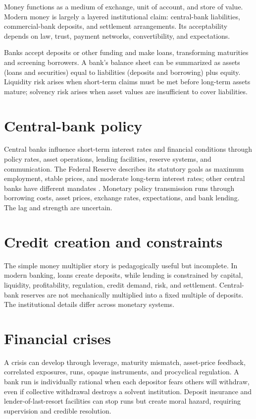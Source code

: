 \documentclass[11pt,oneside,openany]{book}
\begin{document}
Money functions as a medium of exchange, unit of account, and store of value. Modern money is largely a layered institutional claim: central-bank liabilities, commercial-bank deposits, and settlement arrangements. Its acceptability depends on law, trust, payment networks, convertibility, and expectations.

Banks accept deposits or other funding and make loans, transforming maturities and screening borrowers. A bank's balance sheet can be summarized as assets (loans and securities) equal to liabilities (deposits and borrowing) plus equity. Liquidity risk arises when short-term claims must be met before long-term assets mature; solvency risk arises when asset values are insufficient to cover liabilities.

\section{Central-bank policy}

Central banks influence short-term interest rates and financial conditions through policy rates, asset operations, lending facilities, reserve systems, and communication. The Federal Reserve describes its statutory goals as maximum employment, stable prices, and moderate long-term interest rates; other central banks have different mandates \cite{federalreserve}. Monetary policy transmission runs through borrowing costs, asset prices, exchange rates, expectations, and bank lending. The lag and strength are uncertain.

\section{Credit creation and constraints}

The simple money multiplier story is pedagogically useful but incomplete. In modern banking, loans create deposits, while lending is constrained by capital, liquidity, profitability, regulation, credit demand, risk, and settlement. Central-bank reserves are not mechanically multiplied into a fixed multiple of deposits. The institutional details differ across monetary systems.

\section{Financial crises}

A crisis can develop through leverage, maturity mismatch, asset-price feedback, correlated exposures, runs, opaque instruments, and procyclical regulation. A bank run is individually rational when each depositor fears others will withdraw, even if collective withdrawal destroys a solvent institution. Deposit insurance and lender-of-last-resort facilities can stop runs but create moral hazard, requiring supervision and credible resolution.
\end{document}

